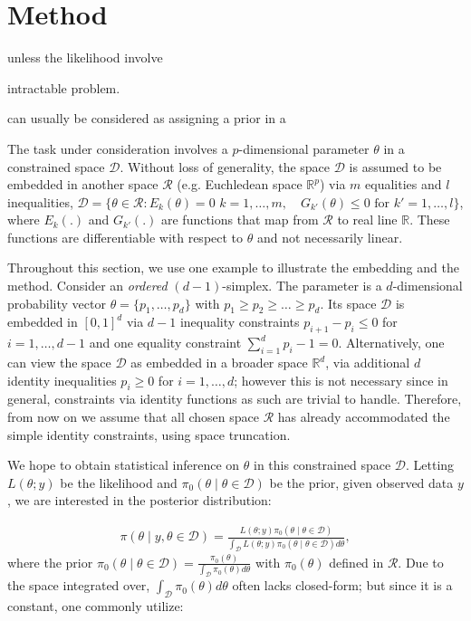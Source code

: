 \documentclass[10pt]{article}
\newcommand{\be}{\begin{equation}\begin{aligned}}
\newcommand{\ee}{\end{aligned}\end{equation}}
\newcommand{\mc}[1]{\mathcal{#1}}
\begin{document}
\section{Method}

 unless the likelihood involve 

 intractable problem. 


can usually be considered as assigning a prior in a 

The task under consideration involves a $p$-dimensional parameter $\theta$ in a constrained space $\mc D$. Without loss of generality, the space $\mc D$ is assumed to be embedded in another space $\mc R$ (e.g. Euchledean space $\mathbb R^p$) via $m$ equalities and $l$ inequalities, $\mc D = \{ \theta \in \mc R: E_k(\theta)=0$  $k=1,\ldots,m, \quad G_{k'}(\theta)\le 0  \text{ for } k'=1,\ldots,l \}$, where $E_k(.)$ and $G_{k'}(.)$ are functions that map from $\mc R$ to real line $\mathbb R$. These functions are differentiable with respect to $\theta$ and not necessarily linear.

Throughout this section, we use one example to illustrate the embedding and the method. Consider an {\it ordered} $(d-1)$-simplex. The parameter is a $d$-dimensional probability vector $\theta=\{p_1,\ldots,p_d\}$ with $p_1\ge p_2 \ge \ldots \ge p_d$. Its space $\mc D$ is embedded in $[0,1]^d$ via $d-1$ inequality constraints $p_{i+1}-p_i \le 0$ for $i=1,\ldots, d-1$ and one equality constraint $\sum_{i=1}^{d} p_i-1 = 0$. Alternatively, one can view the space $\mc D$ as embedded in a broader space $\mathbb R^d$, via additional $d$ identity inequalities $p_i \ge 0$ for $i=1,\ldots,d$; however this is not necessary since in general, constraints via identity functions as such are trivial to handle. Therefore, from now on we assume that all chosen space $\mc R$ has already accommodated the simple identity constraints, using space truncation.

We hope to obtain statistical inference on $\theta$ in this constrained space $\mc D$. Letting $L(\theta;y)$ be the likelihood and $\pi_0(\theta \mid \theta \in \mc D)$ be the prior, given observed data $y$, we are interested in the posterior distribution: 

\be
\pi(\theta \mid y, \theta \in \mc D) = \frac{ L(\theta;y)\pi_0(\theta \mid \theta\in \mc D)}{\int_{\mc D} L(\theta;y)\pi_0(\theta \mid \theta\in \mc D) d\theta },
\ee
where the prior $\pi_0(\theta \mid \theta \in \mc D) = \frac {\pi_0(\theta)}{\int_{\mc D} \pi_0(\theta) d\theta}$ with $\pi_0(\theta)$ defined in $\mc R$. Due to the space integrated over, $\int_{\mc D} \pi_0(\theta) d\theta$ often lacks closed-form; but since it is a constant, one commonly utilize:
\end{document}
